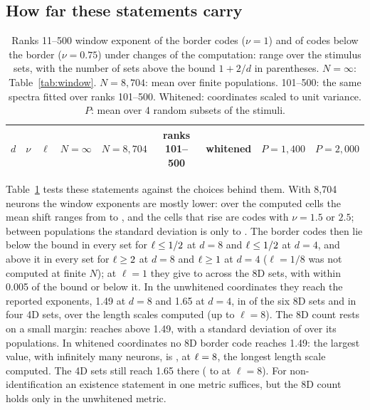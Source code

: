 \subsection{How far these statements carry}

\begin{table}[t]
\centering\footnotesize
\caption{Ranks 11--500 window exponent of the border codes ($\nu = 1$) and of codes below the border ($\nu = 0.75$) under changes of the computation: range over the stimulus sets, with the number of sets above the bound $1 + 2/d$ in parentheses. $N = \infty$: Table~\ref{tab:window}. $N = 8{,}704$: mean over finite populations. 101--500: the same spectra fitted over ranks 101--500. Whitened: coordinates scaled to unit variance. $P$: mean over 4 random subsets of the stimuli.}\label{tab:sens}
\setlength{\tabcolsep}{3pt}
\begin{tabular}{ccc*{6}{c}}
\toprule
$d$ & $\nu$ & $\ell$ & $N = \infty$ & $N = 8{,}704$ & ranks 101--500 & whitened & $P = 1{,}400$ & $P = 2{,}000$ \\
\midrule

\end{tabular}
\end{table}

Table~\ref{tab:sens} tests these statements against the choices behind them. With 8,704 neurons the window exponents are mostly lower: over the \FinCells{} computed cells the mean shift ranges from \FinShiftMin{} to \FinShiftMax{}, and the \FinHigherN{} cells that rise are codes with $\nu = 1.5$ or $2.5$; between populations the standard deviation is only \FinSDMin{} to \FinSDMax{}. The border codes then lie below the bound in every set for $\ell \le 1/2$ at $d = 8$ and $\ell \le 1/2$ at $d = 4$, and above it in every set for $\ell \ge 2$ at $d = 8$ and $\ell \ge 1$ at $d = 4$ ($\ell = 1/8$ was not computed at finite $N$); at $\ell = 1$ they give \FinOneEightMin{} to \FinOneEightMax{} across the 8D sets, with \FinOneNearEight{} within 0.005 of the bound or below it. In the unwhitened coordinates they reach the reported exponents, 1.49 at $d = 8$ and 1.65 at $d = 4$, in \FinReachEight{} of the six 8D sets and in \FinReachAllFour{} four 4D sets, over the length scales computed (up to $\ell = 8$). The 8D count rests on a small margin: \FinReachMarginSetEight{} reaches \FinReachMarginEight{} above 1.49, with a standard deviation of \FinReachMarginSDEight{} over its \FinReachMarginREight{} populations. In whitened coordinates no 8D border code reaches 1.49: the largest value, with infinitely many neurons, is \WhiteBorderEightMaxAll{}, at $\ell = 8$, the longest length scale computed. The 4D sets still reach 1.65 there (\WhiteBorderFourLEightMin{} to \WhiteBorderFourLEightMax{} at $\ell = 8$). For non-identification an existence statement in one metric suffices, but the 8D count holds only in the unwhitened metric.

